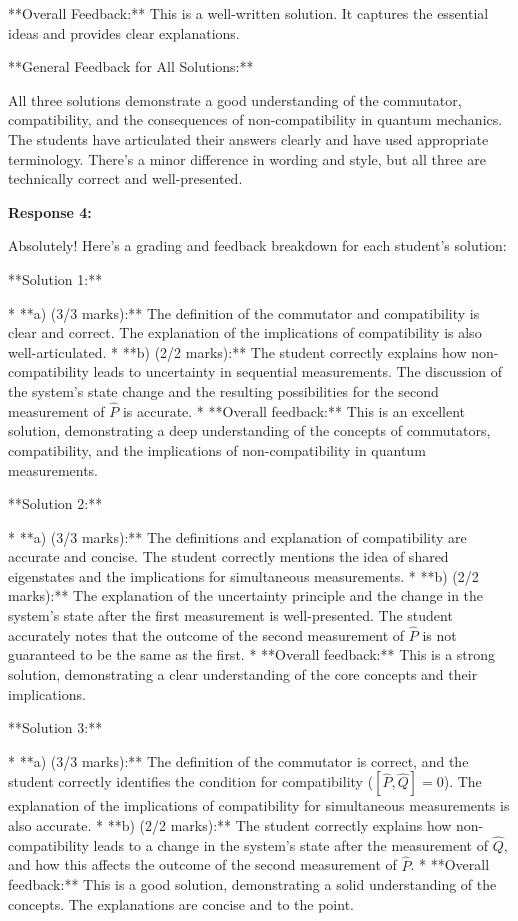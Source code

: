 \documentclass[a4paper,11pt]{article}
\begin{document}
**Overall Feedback:** This is a well-written solution. It captures the essential ideas and provides clear explanations.

**General Feedback for All Solutions:**

All three solutions demonstrate a good understanding of the commutator, compatibility, and the consequences of non-compatibility in quantum mechanics. The students have articulated their answers clearly and have used appropriate terminology.  There's a minor difference in wording and style, but all three are technically correct and well-presented. 

\bigskip    
\textbf{Response 4:}

Absolutely! Here's a grading and feedback breakdown for each student's solution:

**Solution 1:**

* **a) (3/3 marks):**  The definition of the commutator and compatibility is clear and correct. The explanation of the implications of compatibility is also well-articulated.
* **b) (2/2 marks):**  The student correctly explains how non-compatibility leads to uncertainty in sequential measurements. The discussion of the system's state change and the resulting possibilities for the second measurement of  \(\hat{P}\) is accurate.
* **Overall feedback:** This is an excellent solution, demonstrating a deep understanding of the concepts of commutators, compatibility, and the implications of non-compatibility in quantum measurements. 

**Solution 2:**

* **a) (3/3 marks):** The definitions and explanation of compatibility are accurate and concise. The student correctly mentions the idea of shared eigenstates and the implications for simultaneous measurements.
* **b) (2/2 marks):** The explanation of the uncertainty principle and the change in the system's state after the first measurement is well-presented. The student accurately notes that the outcome of the second measurement of  \(\hat{P}\) is not guaranteed to be the same as the first.
* **Overall feedback:** This is a strong solution, demonstrating a clear understanding of the core concepts and their implications.

**Solution 3:**

* **a) (3/3 marks):** The definition of the commutator is correct, and the student correctly identifies the condition for compatibility (\( [\hat{P}, \hat{Q}] = 0 \)). The explanation of the implications of compatibility for simultaneous measurements is also accurate.
* **b) (2/2 marks):** The student correctly explains how non-compatibility leads to a change in the system's state after the measurement of  \(\hat{Q}\), and how this affects the outcome of the second measurement of \(\hat{P}\).
* **Overall feedback:** This is a good solution, demonstrating a solid understanding of the concepts. The explanations are concise and to the point.
\end{document}
